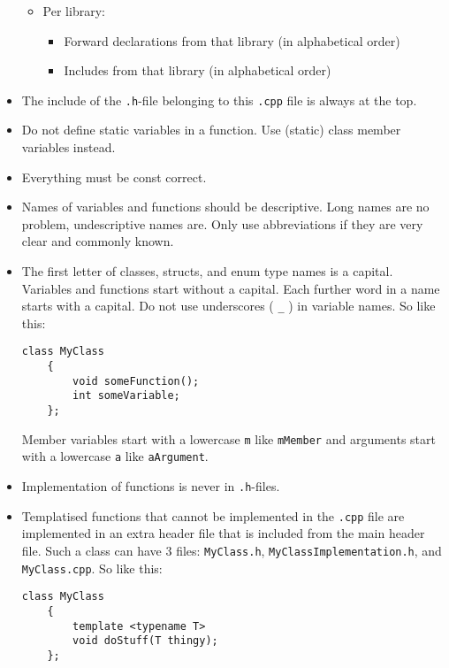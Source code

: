 \documentclass{article}
\begin{document}
\begin{itemize}
\begin{itemize}
        \item Per library:
        \begin{itemize}
            \item Forward declarations from that library (in alphabetical order)
            \item Includes from that library (in alphabetical order)
        \end{itemize}
    \end{itemize}
    \item The include of the \texttt{.h}-file belonging to this \texttt{.cpp} file is always at the top.
    \item Do not define static variables in a function. Use (static) class member variables instead.
    \item Everything must be const correct.
    \item Names of variables and functions should be descriptive. Long names are no problem, undescriptive names are. Only use abbreviations if they are very clear and commonly known.
    \item The first letter of classes, structs, and enum type names is a capital. Variables and functions start without a capital. Each further word in a name starts with a capital. Do not use underscores ( \texttt{\_} ) in variable names. So like this:
    \begin{Verbatim}[fontsize=\small]
    class MyClass
    {
        void someFunction();
        int someVariable;
    };
    \end{Verbatim}
    Member variables start with a lowercase \texttt{m} like \texttt{mMember} and arguments start with a lowercase \texttt{a} like \texttt{aArgument}.
    \item Implementation of functions is never in \texttt{.h}-files.
    \item Templatised functions that cannot be implemented in the \texttt{.cpp} file are implemented in an extra header file that is included from the main header file. Such a class can have 3 files: \texttt{MyClass.h}, \texttt{MyClassImplementation.h}, and \texttt{MyClass.cpp}. So like this:
    \begin{Verbatim}[fontsize=\small]
    class MyClass
    {
        template <typename T>
        void doStuff(T thingy);
    };


\end{Verbatim}
\end{itemize}
\end{document}
